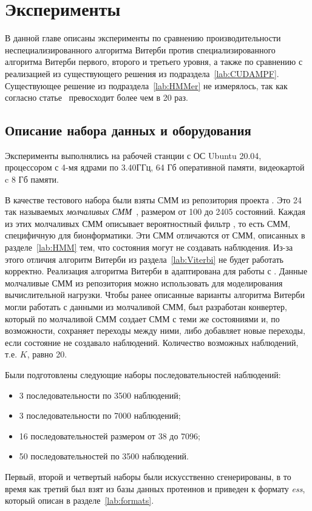 \section{Эксперименты}
В данной главе описаны эксперименты по сравнению 
производительности неспециализированного алгоритма Витерби 
против специализированного алгоритма Витерби первого, второго 
и третьего уровня, а также по сравнению с реализацией из существующего решения  из 
подраздела~\ref{lab:CUDAMPF}.
Существующее решение  из подраздела~\ref{lab:HMMer} не измерялось, так как согласно статье~\cite{cudampf}  превосходит  более чем в 20 раз.

\subsection{Описание набора данных и оборудования}
Эксперименты выполнялись на рабочей станции с ОС Ubuntu 
20.04, процессором  с 4-мя ядрами по 3.40ГГц, 64 Гб оперативной памяти, видеокартой 
 c 8 Гб памяти.

В качестве тестового набора были взяты СММ из репозитория  
проекта .
Это 24 так называемых \emph{молчаливых СММ}~\cite{silentHMM}, 
размером от 100 до 2405 состояний.
Каждая из этих молчаливых СММ описывает вероятностный фильтр , то есть СММ, специфичную для бионформатики.
Эти СММ отличаются от СММ, описанных в разделе~\ref{lab:HMM} 
тем, что состояния могут не создавать наблюдения.
Из-за этого отличия алгоритм Витерби из 
раздела~\ref{lab:Viterbi} не будет работать корректно.
Реализация алгоритма Витерби в  адаптирована для работы с .
Данные молчаливые СММ из репозитория  можно использовать 
для моделирования вычислительной нагрузки.
Чтобы ранее описанные варианты алгоритма Витерби могли 
работать с данными из молчаливой СММ, был разработан 
конвертер, который по молчаливой СММ создает СММ с теми же 
состояниями и, по возможности, сохраняет переходы между ними, 
либо добавляет новые переходы, если состояние не создавало 
наблюдений.
Количество возможных наблюдений, т.е. $K$, равно 20.

Были подготовлены следующие наборы последовательностей наблюдений:
\begin{itemize}
	\item 3 последовательности по 3500 наблюдений;
	\item 3 последовательности по 7000 наблюдений;
	\item 16 последовательностей размером от 38 до 7096;
	\item 50 последовательностей по 3500 наблюдений.
\end{itemize}
Первый, второй и четвертый наборы были искусственно сгенерированы, в то время 
как третий был взят из базы данных протеинов  и 
приведен к формату \emph{ess}, который описан в 
разделе~\ref{lab:formats}.



